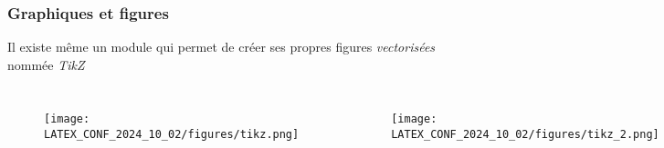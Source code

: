 \begin{frame}
    \frametitle{Graphiques et figures}
    Il existe même un module qui permet de créer ses propres figures \textit{vectorisées} nommée \textcolor{vibrant_green}{\textit{TikZ}}\footnotemark
    \vfill
    \pause
    \begin{columns}
        \begin{figure}
            \centering
            \texttt{[image: LATEX\_CONF\_2024\_10\_02/figures/tikz.png]}
            \label{fig: tikz}
        \end{figure}
        \pause
        \begin{figure}
            \centering
            \texttt{[image: LATEX\_CONF\_2024\_10\_02/figures/tikz\_2.png]}
            \label{fig: tikz_2}
        \end{figure}
        \pause
        \begin{figure}
            \centering
            \texttt{[image: LATEX\_CONF\_2024\_10\_02/figures/tikz\_3.png]}
            \label{fig: tikz_3}
        \end{figure}
    \end{columns}
    \vfill
\end{frame}
